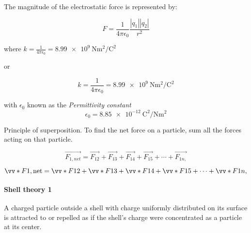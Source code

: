 \documentclass[letterpaper,12pt]{article}
\begin{document}
The magnitude of the electrostatic force is represented by:

\begin{equation}
	F = \frac{1}{4\pi\epsilon_0}\frac{|q_1||q_2|}{r^2}
\end{equation}


where $k = \frac{1}{4\pi\epsilon_0} = \SI{8.99e9}{\newton\meter\squared\per\coulomb\squared}$

or

\begin{equation}
	k = \frac{1}{4\pi\epsilon_0} = \SI{8.99e9}{\newton\meter\squared\per\coulomb\squared}
\end{equation}

with $\epsilon_0$ known as the \textit{Permittivity constant}
\begin{equation}
	\epsilon_0 = \SI{8.85e-12}{\coulomb\squared\per\newton\meter\squared}
\end{equation}

Principle of superposition. To find the net force on a particle, sum all the forces acting on that
particle.

\begin{equation}
	\vec{F_{1,net}} = \vec{F_{12}} + \vec{F_{13}} + \vec{F_{14}} + \vec{F_{15}} + \cdots + \vec{F_{1n,}}
\end{equation}

\begin{equation}
	\vv*{F}{1,\text{net}} = \vv*{F}{12} + \vv*{F}{13} + \vv*{F}{14} + \vv*{F}{15} + \cdots + \vv*{F}{1n,}
\end{equation}



\paragraph{Shell theory 1} A charged particle outside a shell with charge uniformly distributed on its surface is attracted to or repelled as if the shell's charge were concentrated as a particle at its center.
\end{document}
